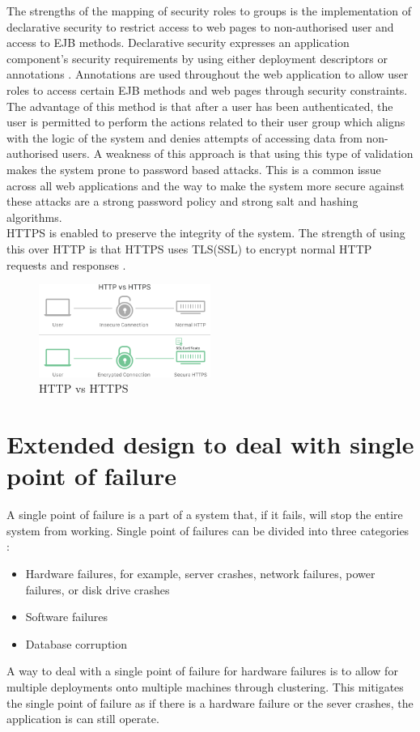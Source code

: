 \documentclass{article}
\begin{document}
The strengths of the mapping of security roles to groups is the implementation of declarative security to restrict access to web pages to non-authorised user and access to EJB methods. Declarative security expresses an application component’s security requirements by using either deployment descriptors or annotations \cite{security}. Annotations are used throughout the web application to allow user roles to access certain EJB methods and web pages through security constraints. The advantage of this method is that after a user has been authenticated, the user is permitted to perform the actions related to their user group which aligns with the logic of the system and denies attempts of accessing data from non-authorised users. A weakness of this approach is that using this type of validation makes the system prone to password based attacks. This is a common issue across all web applications and the way to make the system more secure against these attacks are a strong password policy and strong salt and hashing algorithms. \\

HTTPS is enabled to preserve the integrity of the system. The strength of using this over HTTP is that HTTPS uses TLS(SSL) to encrypt normal HTTP requests and responses \cite{https}.

\begin{figure}[h!]
  \centering
  \includegraphics[width=0.5\textwidth]{images/http-vs-https (1).png}
  \caption{HTTP vs HTTPS \cite{https}}
\end{figure}

\newpage

\section{Extended design to deal with single point of failure}

A single point of failure is a part of a system that, if it fails, will stop the entire system from working. Single point of failures can be divided into three categories \cite{SPOF}:
\begin{itemize}
    \item Hardware failures, for example, server crashes, network failures, power failures, or disk drive crashes
    \item Software failures
    \item Database corruption
\end{itemize}
A way to deal with a single point of failure for hardware failures is to allow for multiple deployments onto multiple machines through clustering. This mitigates the single point of failure as if there is a hardware failure or the sever crashes, the application is can still operate. \\
\end{document}
